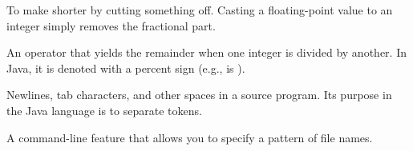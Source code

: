 \begin{description}
To make shorter by cutting something off.
Casting a floating-point value to an integer simply removes the fractional part.

An operator that yields the remainder when one integer is divided by another.
In Java, it is denoted with a percent sign (e.g.,  is ).

Newlines, tab characters, and other spaces in a source program.
Its purpose in the Java language is to separate tokens.

A command-line feature that allows you to specify a pattern of file names.

\end{description}
